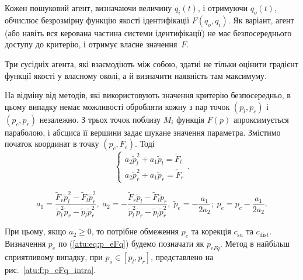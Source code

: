 \documentclass[a4paper,13pt]{atuaref}
\begin{document}
Кожен пошуковий агент, визначаючи величину $q_{i}(t)$, і отримуючи $q_o(t)$,
обчислює безрозмірну функцію якості ідентифікації $F (q_o, q_i)$. Як
варіант, агент (або навіть вся керована частина системи ідентифікації) не має
безпосереднього доступу до критерію, і отримує власне значення~$F$.

Три сусідніх агента, які взаємодіють між собою, здатні не тільки оцінити градієнт
функції якості у власному околі, а й визначити наявність там
максимуму.

На відміну від методів, які використовують значення критерію безпосередньо, в
цьому випадку немає можливості обробляти кожну з пар точок $(p_l, p_c)$ і
$(p_c, p_r)$ незалежно. З трьох точок поблизу $M_{i}$ функція $F(p)$
апроксимується параболою, і абсциса її вершини задає шукане значення параметра.
Змістимо початок координат в точку
$(p_c, F_c)$. Тоді
\[
  \left\{
    \begin{array}{l}
      a_2 \tilde{p}_l^2 + a_1 \tilde{p}_l  = \tilde{F}_l
      \\
      a_2 \tilde{p}_r^2 + a_1 \tilde{p}_r  = \tilde{F}_r
    \end{array}
  \right. .
\]
%
%

\begin{equation}
   a_1 = \frac{\tilde{F}_r \tilde{p}_l^2 - \tilde{F}_l \tilde{p}_r^2 }
              { \tilde{p}_l^2 \tilde{p}_r  - \tilde{p}_l \tilde{p}_r^2 },
  \;
  a_2 = - \frac{\tilde{F}_r \tilde{p}_l - \tilde{F}_l \tilde{p}_r }
               { \tilde{p}_l^2 \tilde{p}_r  - \tilde{p}_l \tilde{p}_r^2 },
  \;
  \tilde{p}_e = - \frac{a_1}{2 a_2};
  \;
  p_e = p_c - \frac{a_1}{2 a_2}.
  \label{atu:eq:p_eFq}
\end{equation}

При цьому, якщо
$a_2 \ge 0$,
то потрібне обмеження $p_e$ та корекція $c_\mathrm{su}$ та $c_\mathrm{dist}$.
Визначення $p_e$ по (\ref{atu:eq:p_eFq}) будемо позначати як $p_{eFq}$.
Метод в найбільш сприятливому випадку, при
$p_o \in [p_l,p_r]$, представлено на рис.~\ref{atu:f:p_eFq_intra}.
\end{document}
